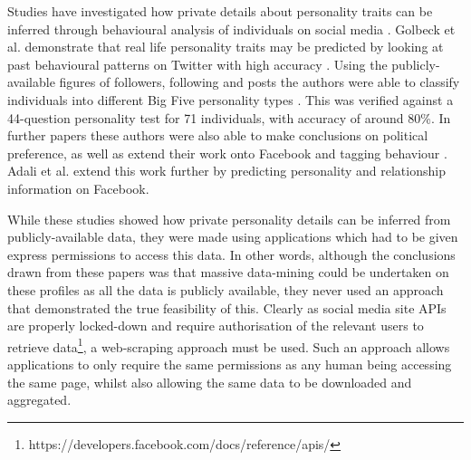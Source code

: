 Studies have investigated how private details about personality traits can be inferred through behavioural analysis of individuals on social media \cite{adali2012predicting,adali2012actions,bachrach2012personality,golbeck2011predicting,golbeck2011computing,golbeck2011,golbeck2011experimental}. Golbeck et al. demonstrate that real life personality traits may be predicted by looking at past behavioural patterns on Twitter with high accuracy \cite{golbeck2011predicting}. Using the publicly-available figures of followers, following and posts the authors were able to classify individuals into different Big Five personality types \cite{de2000big}. This was verified against a 44-question personality test for 71 individuals, with accuracy of around 80\%. In further papers these authors were also able to make conclusions on political preference, as well as extend their work onto Facebook and tagging behaviour \cite{golbeck2011computing,golbeck2011,golbeck2011experimental}. Adali et al. \cite{adali2012predicting,
adali2012actions} extend this work further by predicting personality and relationship information on Facebook.

While these studies showed how private personality details can be inferred from publicly-available data, they were made using applications which had to be given express permissions to access this data. In other words, although the conclusions drawn from these papers was that massive data-mining could be undertaken on these profiles as all the data is publicly available, they never used an approach that demonstrated the true feasibility of this. Clearly as social media site APIs are properly locked-down and require authorisation of the relevant users to retrieve data\footnote{https://developers.facebook.com/docs/reference/apis/}, a web-scraping approach must be used. Such an approach allows applications to only require the same permissions as any human being accessing the same page, whilst also allowing the same data to be downloaded and aggregated.

